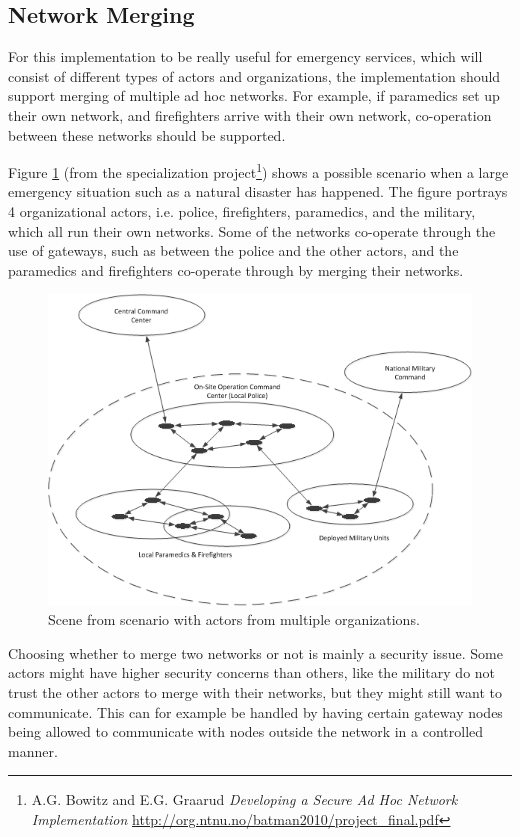 \subsection{Network Merging}
For this implementation to be really useful for emergency services, which will
consist of different types of actors and organizations, the implementation
should support merging of multiple ad hoc networks. For example, if paramedics
set up their own network, and firefighters arrive with their own network,
co-operation between these networks should be supported.

Figure \ref{fig:scenario_networks} (from the specialization
project\footnote{A.G. Bowitz and E.G. Graarud \textit{Developing a Secure Ad
Hoc Network Implementation}
\url{http://org.ntnu.no/batman2010/project_final.pdf}}) shows a possible
scenario when a large emergency situation such as a natural disaster has
happened. The figure portrays 4 organizational actors, i.e. police,
firefighters, paramedics, and the military, which all run their own networks.
Some of the networks co-operate through the use of gateways, such as between the
police and the other actors, and the paramedics and firefighters co-operate
through by merging their networks.

\begin{figure}[h]
	\centering
  	\includegraphics[width=\textwidth]{images/scenario.png}
  	\caption{Scene from scenario with actors from multiple organizations.}
	\label{fig:scenario_networks}
\end{figure}

Choosing whether to merge two networks or not is mainly a security issue. Some
actors might have higher security concerns than others, like the military do not
trust the other actors to merge with their networks, but they might still want
to communicate. This can for example be handled by having certain gateway nodes
being allowed to communicate with nodes outside the network in a controlled
manner.

